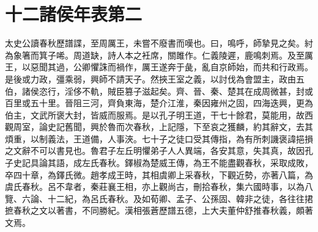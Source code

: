 \onecolumn
\chapter{十二諸侯年表第二}

太史公讀春秋歷譜諜，至周厲王，未嘗不廢書而嘆也。曰，鳴呼，師摯見之矣。紂為象箸而箕子唏。周道缺，詩人本之衽席，關雎作。仁義陵遲，鹿鳴刺焉。及至厲王，以惡聞其過，公卿懼誅而禍作，厲王遂奔于彘，亂自京師始，而共和行政焉。是後或力政，彊乘弱，興師不請天子。然挾王室之義，以討伐為會盟主，政由五伯，諸侯恣行，淫侈不軌，賊臣篡子滋起矣。齊、晉、秦、楚其在成周微甚，封或百里或五十里。晉阻三河，齊負東海，楚介江淮，秦因雍州之固，四海迭興，更為伯主，文武所褒大封，皆威而服焉。是以孔子明王道，干七十餘君，莫能用，故西觀周室，論史記舊聞，興於魯而次春秋，上記隱，下至哀之獲麟，約其辭文，去其煩重，以制義法，王道備，人事浹。七十子之徒口受其傳指，為有所刺譏褒諱挹損之文辭不可以書見也。魯君子左丘明懼弟子人人異端，各安其意，失其真，故因孔子史記具論其語，成左氏春秋。鐸椒為楚威王傳，為王不能盡觀春秋，采取成敗，卒四十章，為鐸氏微。趙孝成王時，其相虞卿上采春秋，下觀近勢，亦著八篇，為虞氏春秋。呂不韋者，秦莊襄王相，亦上觀尚古，刪拾春秋，集六國時事，以為八覽、六論、十二紀，為呂氏春秋。及如荀卿、孟子、公孫固、韓非之徒，各往往捃摭春秋之文以著書，不同勝紀。漢相張蒼歷譜五德，上大夫董仲舒推春秋義，頗著文焉。

